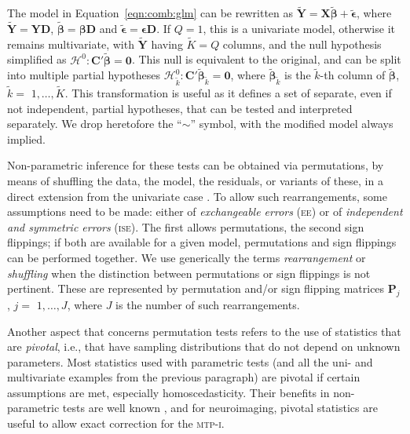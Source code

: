 The model in Equation~\ref{eqn:comb:glm} can be rewritten as $\tilde{\mathbf{Y}} = \mathbf{X}\tilde{\boldsymbol{\beta}} + \tilde{\boldsymbol{\epsilon}}$, where $\tilde{\mathbf{Y}}=\mathbf{Y}\mathbf{D}$, $\tilde{\boldsymbol{\beta}}=\boldsymbol{\beta}\mathbf{D}$ and $\tilde{\boldsymbol{\epsilon}}=\boldsymbol{\epsilon}\mathbf{D}$. If $Q=1$, this is a univariate model, otherwise it remains multivariate, with $\tilde{\mathbf{Y}}$ having $\tilde{K}=Q$ columns, and the null hypothesis simplified as $\mathcal{H}^{0} : \mathbf{C}'\tilde{\boldsymbol{\beta}} = \boldsymbol{0}$. This null is equivalent to the original, and can be split into multiple partial hypotheses $\mathcal{H}^{0}_{\tilde{k}} : \mathbf{C}'\tilde{\boldsymbol{\beta}}_{\tilde{k}} = \boldsymbol{0}$, where $\tilde{\boldsymbol{\beta}}_{\tilde{k}}$ is the $\tilde{k}$-th column of $\tilde{\boldsymbol{\beta}}$, $\tilde{k} =$ $1, \ldots , \tilde{K}$. This transformation is useful as it defines a set of separate, even if not independent, partial hypotheses, that can be tested and interpreted separately. We drop heretofore the ``$\sim$'' symbol, with the modified model always implied.

Non-parametric inference for these tests can be obtained via permutations, by means of shuffling the data, the model, the residuals, or variants of these, in a direct extension from the univariate case \citep[Table~\ref{tab:perm:methods}, also published in]{Winkler2014}. To allow such rearrangements, some assumptions need to be made: either of \emph{exchangeable errors} (\textsc{ee}) or of \emph{independent and symmetric errors} (\textsc{ise}). The first allows permutations, the second sign flippings; if both are available for a given model, permutations and sign flippings can be performed together. We use generically the terms \emph{rearrangement} or \emph{shuffling} when the distinction between permutations or sign flippings is not pertinent. These are represented by permutation and/or sign flipping matrices $\mathbf{P}_{j}$, $j =$ $1, \ldots , J$, where $J$ is the number of such rearrangements.

Another aspect that concerns permutation tests refers to the use of statistics that are \emph{pivotal}, i.e., that have sampling distributions that do not depend on unknown parameters. Most statistics used with parametric tests (and all the uni- and multivariate examples from the previous paragraph) are pivotal if certain assumptions are met, especially homoscedasticity. Their benefits in non-parametric tests are well known \citep{Hall1991}, and for neuroimaging, pivotal statistics are useful to allow exact correction for the \textsc{mtp-i}.

